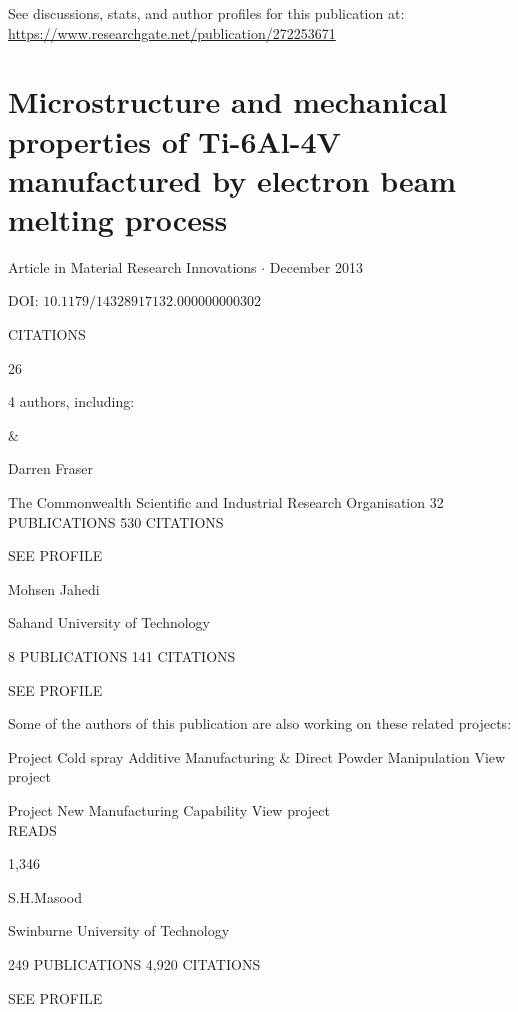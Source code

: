 \documentclass[10pt]{article}
\begin{document}
See discussions, stats, and author profiles for this publication at: \href{https://www.researchgate.net/publication/272253671}{https://www.researchgate.net/publication/272253671}

\section*{Microstructure and mechanical properties of Ti-6Al-4V manufactured by electron beam melting process}
Article in Material Research Innovations $\cdot$ December 2013

DOI: $10.1179 / 14328917132.000000000302$

CITATIONS

26

4 authors, including:

\&

Darren Fraser

The Commonwealth Scientific and Industrial Research Organisation 32 PUBLICATIONS 530 CITATIONS

SEE PROFILE

Mohsen Jahedi

Sahand University of Technology

8 PUBLICATIONS 141 CITATIONS

SEE PROFILE

Some of the authors of this publication are also working on these related projects:

Project Cold spray Additive Manufacturing \& Direct Powder Manipulation View project

Project New Manufacturing Capability View project\\
READS

1,346

S.H.Masood

Swinburne University of Technology

249 PUBLICATIONS 4,920 CITATIONS

SEE PROFILE
\end{document}

